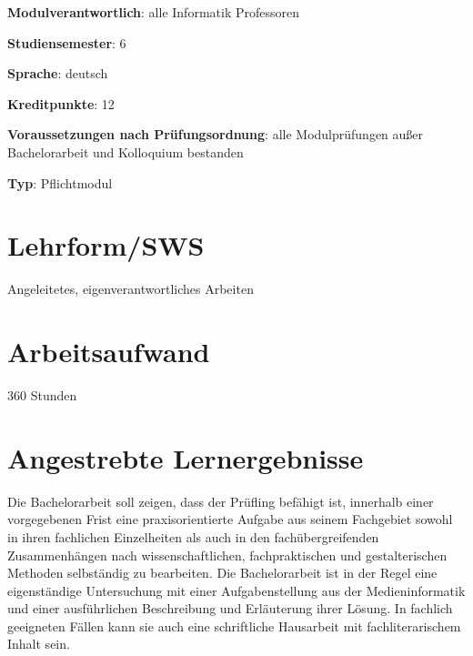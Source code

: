 \begin{modulHead}
\textbf{Modulverantwortlich}: alle Informatik
Professoren
\end{modulHead}
\begin{modulHead}
\textbf{Studiensemester}:
6
\end{modulHead}
\begin{modulHead}
\textbf{Sprache}:
deutsch
\end{modulHead}
\begin{modulHead}
\textbf{Kreditpunkte}:
12
\end{modulHead}
\begin{modulHead}
\textbf{Voraussetzungen nach
Prüfungsordnung}: alle Modulprüfungen außer Bachelorarbeit und
Kolloquium bestanden
\end{modulHead}
\begin{modulHead}
\textbf{Typ}:
Pflichtmodul
\end{modulHead}


\section*{Lehrform/SWS\label{/mi-2017/modulbeschreibungen-bachelor/BA_Bachelorarbeit}}\label{lehrformswspathlabelmi-2017modulbeschreibungen-bachelorbaux5fbachelorarbeit}

Angeleitetes, eigenverantwortliches Arbeiten

\section*{Arbeitsaufwand\label{/mi-2017/modulbeschreibungen-bachelor/BA_Bachelorarbeit}}\label{arbeitsaufwandpathlabelmi-2017modulbeschreibungen-bachelorbaux5fbachelorarbeit}

360 Stunden

\section*{Angestrebte
Lernergebnisse\label{/mi-2017/modulbeschreibungen-bachelor/BA_Bachelorarbeit}}\label{angestrebte-lernergebnissepathlabelmi-2017modulbeschreibungen-bachelorbaux5fbachelorarbeit}

Die Bachelorarbeit soll zeigen, dass der Prüfling befähigt ist,
innerhalb einer vorgegebenen Frist eine praxisorientierte Aufgabe aus
seinem Fachgebiet sowohl in ihren fachlichen Einzelheiten als auch in
den fachübergreifenden Zusammenhängen nach wissenschaftlichen,
fachpraktischen und gestalterischen Methoden selbständig zu bearbeiten.
Die Bachelorarbeit ist in der Regel eine eigenständige Untersuchung mit
einer Aufgabenstellung aus der Medieninformatik und einer ausführlichen
Beschreibung und Erläuterung ihrer Lösung. In fachlich geeigneten Fällen
kann sie auch eine schriftliche Hausarbeit mit fachliterarischem Inhalt
sein.

